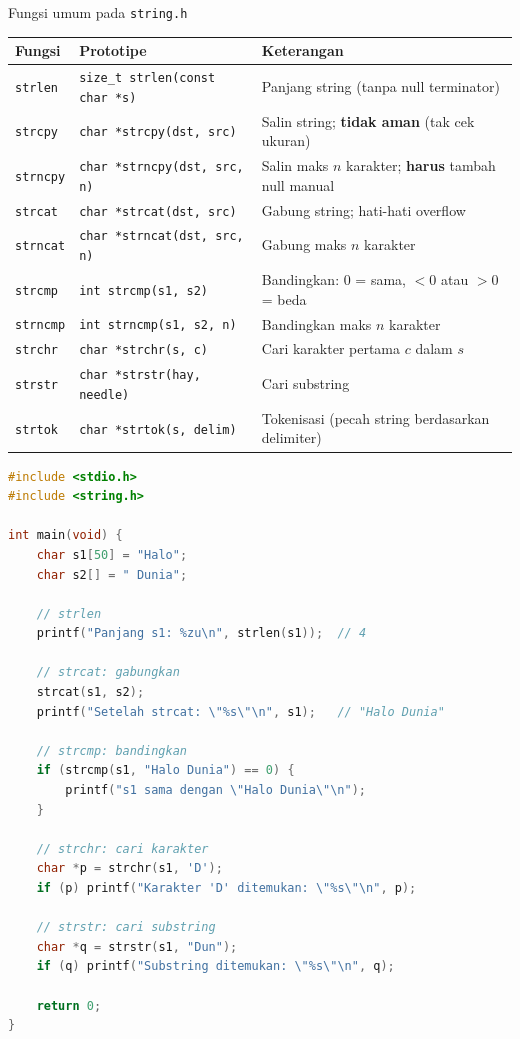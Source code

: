 \documentclass[../main.tex]{subfiles}
\begin{document}
\begin{modultable}[]{Fungsi umum pada \texttt{string.h}}
\begin{tabular}{|l|l|p{6cm}|}
\hline
\textbf{Fungsi} & \textbf{Prototipe} & \textbf{Keterangan} \\
\hline
\texttt{strlen} & \texttt{size\_t strlen(const char *s)} & Panjang string (tanpa null terminator) \\
\hline
\texttt{strcpy} & \texttt{char *strcpy(dst, src)} & Salin string; \textbf{tidak aman} (tak cek ukuran) \\
\hline
\texttt{strncpy} & \texttt{char *strncpy(dst, src, n)} & Salin maks $n$ karakter; \textbf{harus} tambah null manual \\
\hline
\texttt{strcat} & \texttt{char *strcat(dst, src)} & Gabung string; hati-hati overflow \\
\hline
\texttt{strncat} & \texttt{char *strncat(dst, src, n)} & Gabung maks $n$ karakter \\
\hline
\texttt{strcmp} & \texttt{int strcmp(s1, s2)} & Bandingkan: 0 = sama, $<$0 atau $>$0 = beda \\
\hline
\texttt{strncmp} & \texttt{int strncmp(s1, s2, n)} & Bandingkan maks $n$ karakter \\
\hline
\texttt{strchr} & \texttt{char *strchr(s, c)} & Cari karakter pertama $c$ dalam $s$ \\
\hline
\texttt{strstr} & \texttt{char *strstr(hay, needle)} & Cari substring \\
\hline
\texttt{strtok} & \texttt{char *strtok(s, delim)} & Tokenisasi (pecah string berdasarkan delimiter) \\
\hline
\end{tabular}
\end{modultable}

\begin{lstlisting}[language=C,caption=Demonstrasi fungsi string]
#include <stdio.h>
#include <string.h>

int main(void) {
    char s1[50] = "Halo";
    char s2[] = " Dunia";
    
    // strlen
    printf("Panjang s1: %zu\n", strlen(s1));  // 4
    
    // strcat: gabungkan
    strcat(s1, s2);
    printf("Setelah strcat: \"%s\"\n", s1);   // "Halo Dunia"
    
    // strcmp: bandingkan
    if (strcmp(s1, "Halo Dunia") == 0) {
        printf("s1 sama dengan \"Halo Dunia\"\n");
    }
    
    // strchr: cari karakter
    char *p = strchr(s1, 'D');
    if (p) printf("Karakter 'D' ditemukan: \"%s\"\n", p);
    
    // strstr: cari substring
    char *q = strstr(s1, "Dun");
    if (q) printf("Substring ditemukan: \"%s\"\n", q);
    
    return 0;
}
\end{lstlisting}
\end{document}
